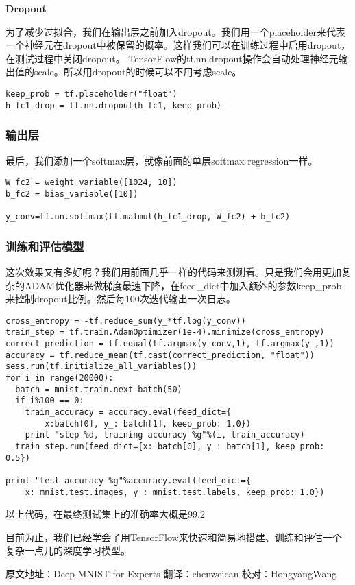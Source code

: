 \textbf{Dropout}

为了减少过拟合，我们在输出层之前加入dropout。我们用一个placeholder来代表一个神经元在dropout中被保留的概率。这样我们可以在训练过程中启用dropout，在测试过程中关闭dropout。 TensorFlow的tf.nn.dropout操作会自动处理神经元输出值的scale。所以用dropout的时候可以不用考虑scale。

\begin{lstlisting}
keep_prob = tf.placeholder("float")
h_fc1_drop = tf.nn.dropout(h_fc1, keep_prob)
\end{lstlisting}

\subsubsection{输出层}

最后，我们添加一个softmax层，就像前面的单层softmax regression一样。

\begin{lstlisting}
W_fc2 = weight_variable([1024, 10])
b_fc2 = bias_variable([10])

y_conv=tf.nn.softmax(tf.matmul(h_fc1_drop, W_fc2) + b_fc2)
\end{lstlisting}

\subsubsection{训练和评估模型}

这次效果又有多好呢？我们用前面几乎一样的代码来测测看。只是我们会用更加复杂的ADAM优化器来做梯度最速下降，在feed\_dict中加入额外的参数keep\_prob来控制dropout比例。然后每100次迭代输出一次日志。

\begin{lstlisting}
cross_entropy = -tf.reduce_sum(y_*tf.log(y_conv))
train_step = tf.train.AdamOptimizer(1e-4).minimize(cross_entropy)
correct_prediction = tf.equal(tf.argmax(y_conv,1), tf.argmax(y_,1))
accuracy = tf.reduce_mean(tf.cast(correct_prediction, "float"))
sess.run(tf.initialize_all_variables())
for i in range(20000):
  batch = mnist.train.next_batch(50)
  if i%100 == 0:
    train_accuracy = accuracy.eval(feed_dict={
        x:batch[0], y_: batch[1], keep_prob: 1.0})
    print "step %d, training accuracy %g"%(i, train_accuracy)
  train_step.run(feed_dict={x: batch[0], y_: batch[1], keep_prob: 0.5})

print "test accuracy %g"%accuracy.eval(feed_dict={
    x: mnist.test.images, y_: mnist.test.labels, keep_prob: 1.0})
\end{lstlisting}

以上代码，在最终测试集上的准确率大概是99.2%

目前为止，我们已经学会了用TensorFlow来快速和简易地搭建、训练和评估一个复杂一点儿的深度学习模型。

原文地址：Deep MNIST for Experts
翻译：chenweican
校对：HongyangWang